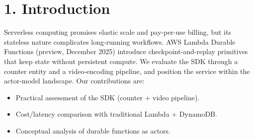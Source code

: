 \section*{1. Introduction}
Serverless computing promises elastic scale and pay-per-use billing, but its stateless nature complicates long-running workflows.
AWS Lambda Durable Functions (preview, December 2025) introduce checkpoint-and-replay primitives that keep state without persistent compute.
We evaluate the SDK through a counter entity and a video-encoding pipeline, and position the service within the actor-model landscape.
Our contributions are:
\begin{itemize}
  \item Practical assessment of the SDK (counter + video pipeline).
  \item Cost/latency comparison with traditional Lambda + DynamoDB.
  \item Conceptual analysis of durable functions as actors.
\end{itemize}
